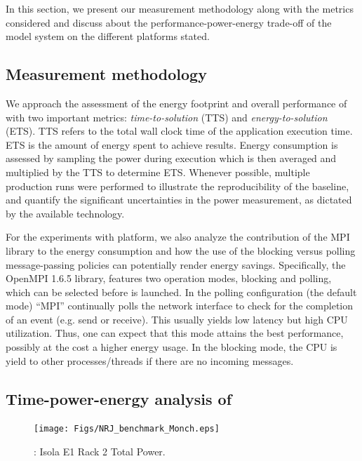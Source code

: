 In this section, we present our measurement methodology along with the
metrics considered and discuss about the performance-power-energy trade-off of the model system on the different platforms stated.

\subsection{Measurement methodology}
\label{subsec:4.1}

We  approach  the  assessment  of  the energy  footprint  and  overall
performance   of   \cosmoart   with  two   important  metrics:
\textit{time-to-solution} (TTS) and \textit{energy-to-solution} (ETS).
TTS refers to  the total wall clock time  of the application execution
time. ETS  is the amount of  energy spent to  achieve results.  Energy
consumption  is  assessed by  sampling  the  power during execution which is then averaged and multiplied  by the TTS to determine  ETS. Whenever  possible,  multiple production  runs  were
performed  to  illustrate the  reproducibility  of  the baseline,  and
quantify the  significant uncertainties  in the power  measurement, as
dictated by the available technology.

For the experiments with \tinto platform, we also analyze the contribution of the MPI library to the energy consumption and how the use of the blocking versus polling message-passing policies can potentially render energy savings. Specifically, the OpenMPI 1.6.5 library, 
features two operation modes, blocking and polling, which can be selected before \cosmoart
is launched. In the polling configuration (the default mode) ``MPI'' continually polls
the network interface to check for the completion of an event (e.g. send or receive).
This usually yields low latency but high CPU utilization. Thus, one can expect that this mode 
attains the best performance, possibly at the cost a higher energy usage. In the blocking
mode, the CPU is yield to other processes/threads if there are no incoming messages.

\subsection{Time-power-energy analysis of \cosmoart}
\label{subsec:4.2}

\begin{figure}[htbf]
  \begin{center}
    \texttt{[image: Figs/NRJ\_benchmark\_Monch.eps]}
    \caption{\monch: Isola E1 Rack 2 Total Power.}
    \label{fig:1}
  \end{center}
\end{figure}

